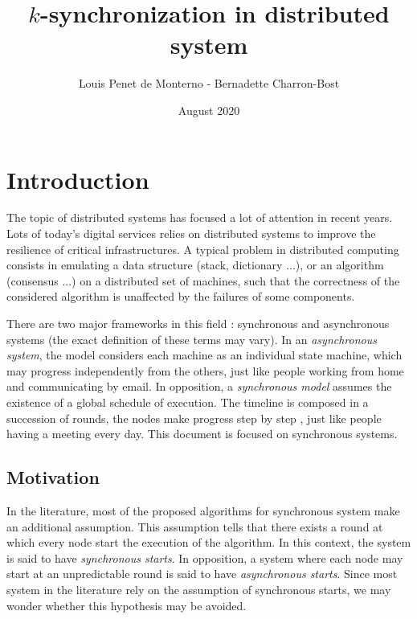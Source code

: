 \documentclass{article}
\title{$k$-synchronization in distributed system}
\date{August 2020}
\author{Louis Penet de Monterno - Bernadette Charron-Bost}
\begin{document}
\maketitle

\section{Introduction}

The topic of distributed systems has focused a lot of attention in recent years.
Lots of today's digital services relies on distributed systems to improve the resilience of critical infrastructures.
A typical problem in distributed computing consists in emulating a data structure (stack, dictionary ...), or an algorithm (consensus ...) on a distributed
set of machines, such that the correctness of the considered algorithm is unaffected by the failures of some components.

There are two major frameworks in this field : synchronous and asynchronous systems (the exact definition of these terms may vary).
In an \emph{asynchronous system}, the model considers each machine as an individual state machine, which may progress independently from the others,
just like people working from home and communicating by email.
In opposition, a \emph{synchronous model} assumes the existence of a global schedule of execution.
The timeline is composed in a succession of rounds, the nodes make progress step by step \cite{closed_communic},
just like people having a meeting every day.
This document is focused on synchronous systems.


\subsection{Motivation}

In the literature, most of the proposed algorithms for synchronous system make an additional assumption.
This assumption tells that there exists a round at which every node start the execution of the algorithm.
In this context, the system is said to have \emph{synchronous starts}.
In opposition, a system where each node may start at an unpredictable round is said to have \emph{asynchronous starts}.
Since most system in the literature rely on the assumption of synchronous starts, we may wonder whether this hypothesis may be avoided.
\end{document}
